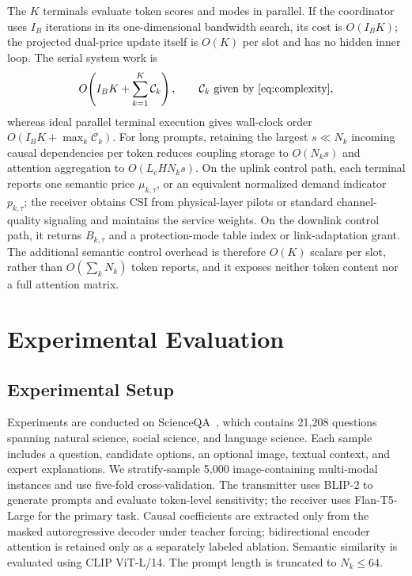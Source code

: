 \documentclass[journal]{IEEEtran}
\begin{document}
The $K$ terminals evaluate token scores and modes in parallel. If the coordinator uses $I_B$ iterations in its one-dimensional bandwidth search, its cost is $O(I_BK)$; the projected dual-price update itself is $O(K)$ per slot and has no hidden inner loop. The serial system work is
\begin{equation}
O\!\left(I_BK+\sum_{k=1}^{K}\mathcal C_k\right),
\qquad
\mathcal C_k\text{ given by~\eqref{eq:complexity}},
\label{eq:system_complexity}
\end{equation}
whereas ideal parallel terminal execution gives wall-clock order $O(I_BK+\max_k\mathcal C_k)$. For long prompts, retaining the largest $s\ll N_k$ incoming causal dependencies per token reduces coupling storage to $O(N_ks)$ and attention aggregation to $O(L_cHN_ks)$. On the uplink control path, each terminal reports one semantic price $\mu_{k,\tau}$, or an equivalent normalized demand indicator $p_{k,\tau}$; the receiver obtains CSI from physical-layer pilots or standard channel-quality signaling and maintains the service weights. On the downlink control path, it returns $B_{k,\tau}$ and a protection-mode table index or link-adaptation grant. The additional semantic control overhead is therefore $O(K)$ scalars per slot, rather than $O(\sum_kN_k)$ token reports, and it exposes neither token content nor a full attention matrix.

\section{Experimental Evaluation}
\label{sec:exp}


\subsection{Experimental Setup}

Experiments are conducted on ScienceQA~\cite{lu2022learn}, which contains 21,208 questions spanning natural science, social science, and language science. Each sample includes a question, candidate options, an optional image, textual context, and expert explanations. We stratify-sample 5,000 image-containing multi-modal instances and use five-fold cross-validation. The transmitter uses BLIP-2 to generate prompts and evaluate token-level sensitivity; the receiver uses Flan-T5-Large for the primary task. Causal coefficients are extracted only from the masked autoregressive decoder under teacher forcing; bidirectional encoder attention is retained only as a separately labeled ablation. Semantic similarity is evaluated using CLIP ViT-L/14. The prompt length is truncated to $N_k\leq64$.
\end{document}
